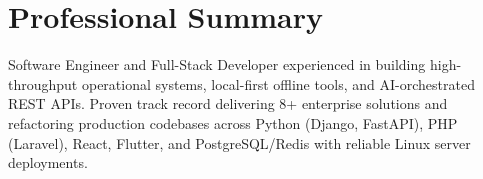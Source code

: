 \section{Professional Summary}
Software Engineer and Full-Stack Developer experienced in building high-throughput operational systems, local-first offline tools, and AI-orchestrated REST APIs. Proven track record delivering 8+ enterprise solutions and refactoring production codebases across Python (Django, FastAPI), PHP (Laravel), React, Flutter, and PostgreSQL/Redis with reliable Linux server deployments.
